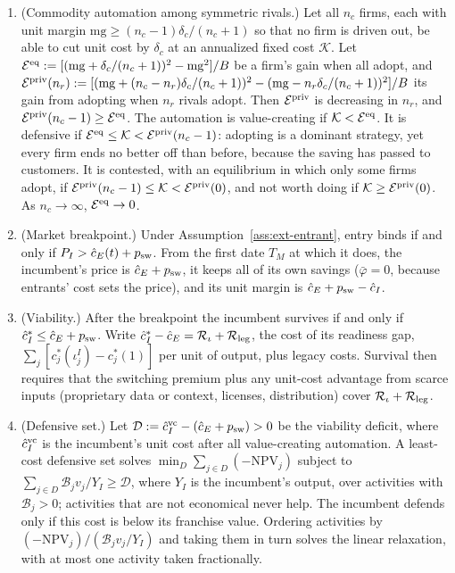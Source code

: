\begin{proposition}\label{prop:ext-should}
\begin{enumerate}
\item[(a)] (Commodity automation among symmetric rivals.) Let all $n_c$ firms, each with unit margin $\mathrm{mg}\ge(n_c-1)\delta_c/(n_c+1)$ so that no firm is driven out, be able to cut unit cost by $\delta_c$ at an annualized fixed cost $\mathcal K$. Let $\mathcal E^{\rm eq}:=[(\mathrm{mg}+\delta_c/(n_c+1))^2-\mathrm{mg}^2]/B$ be a firm's gain when all adopt, and $\mathcal E^{\rm priv}(n_r):=[(\mathrm{mg}+(n_c-n_r)\delta_c/(n_c+1))^2-(\mathrm{mg}-n_r\delta_c/(n_c+1))^2]/B$ its gain from adopting when $n_r$ rivals adopt. Then $\mathcal E^{\rm priv}$ is decreasing in $n_r$, and $\mathcal E^{\rm priv}(n_c-1)\ge\mathcal E^{\rm eq}$. The automation is value-creating if $\mathcal K<\mathcal E^{\rm eq}$. It is defensive if $\mathcal E^{\rm eq}\le\mathcal K<\mathcal E^{\rm priv}(n_c-1)$: adopting is a dominant strategy, yet every firm ends no better off than before, because the saving has passed to customers. It is contested, with an equilibrium in which only some firms adopt, if $\mathcal E^{\rm priv}(n_c-1)\le\mathcal K<\mathcal E^{\rm priv}(0)$, and not worth doing if $\mathcal K\ge\mathcal E^{\rm priv}(0)$. As $n_c\to\infty$, $\mathcal E^{\rm eq}\to0$.
\item[(b)] (Market breakpoint.) Under Assumption~\ref{ass:ext-entrant}, entry binds if and only if $P_I>\hat c_E(t)+p_{\rm sw}$. From the first date $T_M$ at which it does, the incumbent's price is $\hat c_E+p_{\rm sw}$, it keeps all of its own savings ($\bar\varphi=0$, because entrants' cost sets the price), and its unit margin is $\hat c_E+p_{\rm sw}-\hat c_I$.
\item[(c)] (Viability.) After the breakpoint the incumbent survives if and only if $\hat c_I^*\le\hat c_E+p_{\rm sw}$. Write $\hat c_I^*-\hat c_E=\mathcal R_\iota+\mathcal R_{\rm leg}$, the cost of its readiness gap, $\sum_j[c^*_j(\iota^I_j)-c^*_j(1)]$ per unit of output, plus legacy costs. Survival then requires that the switching premium plus any unit-cost advantage from scarce inputs (proprietary data or context, licenses, distribution) cover $\mathcal R_\iota+\mathcal R_{\rm leg}$.
\item[(d)] (Defensive set.) Let $\mathcal D:=\hat c_I^{\rm vc}-(\hat c_E+p_{\rm sw})>0$ be the viability deficit, where $\hat c_I^{\rm vc}$ is the incumbent's unit cost after all value-creating automation. A least-cost defensive set solves $\min_D\sum_{j\in D}(-\mathrm{NPV}_j)$ subject to $\sum_{j\in D}\mathcal B_jv_j/Y_I\ge\mathcal D$, where $Y_I$ is the incumbent's output, over activities with $\mathcal B_j>0$; activities that are not economical never help. The incumbent defends only if this cost is below its franchise value. Ordering activities by $(-\mathrm{NPV}_j)/(\mathcal B_jv_j/Y_I)$ and taking them in turn solves the linear relaxation, with at most one activity taken fractionally.

\end{enumerate}
\end{proposition}
